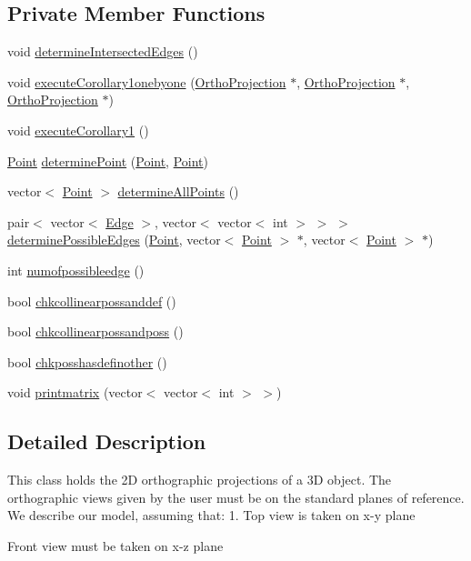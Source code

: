 \subsection*{Private Member Functions}
\begin{DoxyCompactItemize}
\item 
void \hyperlink{class_projection2_d_a6be4ef41d013628ba91a3f1dbcc1f9bf}{determine\+Intersected\+Edges} ()
\item 
void \hyperlink{class_projection2_d_af65b18c0f1aed2c6bda79173ef6a0f5e}{execute\+Corollary1onebyone} (\hyperlink{class_ortho_projection}{Ortho\+Projection} $\ast$, \hyperlink{class_ortho_projection}{Ortho\+Projection} $\ast$, \hyperlink{class_ortho_projection}{Ortho\+Projection} $\ast$)
\item 
void \hyperlink{class_projection2_d_a7433a1a25a81f16a79c308d5dd7d98b5}{execute\+Corollary1} ()
\item 
\hyperlink{class_point}{Point} \hyperlink{class_projection2_d_a0185949b0711aa0a43bd2f66da9aaee7}{determine\+Point} (\hyperlink{class_point}{Point}, \hyperlink{class_point}{Point})
\item 
vector$<$ \hyperlink{class_point}{Point} $>$ \hyperlink{class_projection2_d_af2972a56d0f0fa6a9d01576d7021180d}{determine\+All\+Points} ()
\item 
pair$<$ vector$<$ \hyperlink{class_edge}{Edge} $>$, vector$<$ vector$<$ int $>$ $>$ $>$ \hyperlink{class_projection2_d_ad5f6fe26ce1a18cb5de2fe87e6b0869e}{determine\+Possible\+Edges} (\hyperlink{class_point}{Point}, vector$<$ \hyperlink{class_point}{Point} $>$ $\ast$, vector$<$ \hyperlink{class_point}{Point} $>$ $\ast$)
\item 
int \hyperlink{class_projection2_d_ad277ae374c9340f41f821e3b23aa6c04}{numofpossibleedge} ()
\item 
bool \hyperlink{class_projection2_d_af9a959f2c44a1801687dda170ba0d5d2}{chkcollinearpossanddef} ()
\item 
bool \hyperlink{class_projection2_d_a26179e263ee8be9bfbc260bedaea14c7}{chkcollinearpossandposs} ()
\item 
bool \hyperlink{class_projection2_d_a7b26c1f31633d19a33bdf54e8c47d3d8}{chkposshasdefinother} ()
\item 
void \hyperlink{class_projection2_d_a209abc191321c5bdd970c57c68dd0ac8}{printmatrix} (vector$<$ vector$<$ int $>$ $>$)
\end{DoxyCompactItemize}


\subsection{Detailed Description}
This class holds the 2D orthographic projections of a 3D object. The orthographic views given by the user must be on the standard planes of reference. We describe our model, assuming that\+: 1. Top view is taken on x-\/y plane
\begin{DoxyEnumerate}
\item Front view must be taken on x-\/z plane 
\end{DoxyEnumerate}

